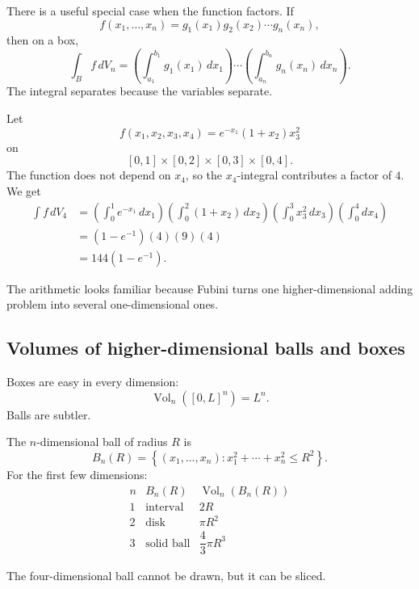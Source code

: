 There is a useful special case when the function factors.  If
\[
    f(x_1,\ldots,x_n)=g_1(x_1)g_2(x_2)\cdots g_n(x_n),
\]
then on a box,
\[
\boxed{
    \int_B f\,dV_n
    =
    \left(\int_{a_1}^{b_1}g_1(x_1)\,dx_1\right)
    \cdots
    \left(\int_{a_n}^{b_n}g_n(x_n)\,dx_n\right).
}
\]
The integral separates because the variables separate.

\begin{example}
Let
\[
    f(x_1,x_2,x_3,x_4)=e^{-x_1}(1+x_2)x_3^2
\]
on
\[
    [0,1]\times[0,2]\times[0,3]\times[0,4].
\]
The function does not depend on \(x_4\), so the \(x_4\)-integral contributes a factor
of \(4\).  We get
\[
\begin{aligned}
\int f\,dV_4
&=
\left(\int_0^1e^{-x_1}\,dx_1\right)
\left(\int_0^2(1+x_2)\,dx_2\right)
\left(\int_0^3x_3^2\,dx_3\right)
\left(\int_0^4 dx_4\right)\\
&=
(1-e^{-1})(4)(9)(4)\\
&=
144(1-e^{-1}).
\end{aligned}
\]
\end{example}

The arithmetic looks familiar because Fubini turns one higher-dimensional adding
problem into several one-dimensional ones.

\subsection{Volumes of higher-dimensional balls and boxes}

Boxes are easy in every dimension:
\[
    \operatorname{Vol}_n([0,L]^n)=L^n.
\]
Balls are subtler.

The \(n\)-dimensional ball of radius \(R\) is
\[
    B_n(R)=
    \left\{
    (x_1,\ldots,x_n):
    x_1^2+\cdots+x_n^2\le R^2
    \right\}.
\]
For the first few dimensions:
\[
\begin{array}{c|c|c}
n & B_n(R) & \operatorname{Vol}_n(B_n(R)) \\ \hline
1 & \text{interval} & 2R\\[1mm]
2 & \text{disk} & \pi R^2\\[1mm]
3 & \text{solid ball} & \dfrac43\pi R^3
\end{array}
\]

The four-dimensional ball cannot be drawn, but it can be sliced.

